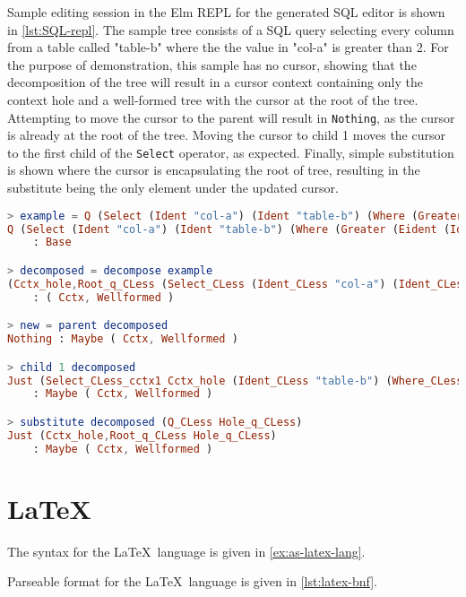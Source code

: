 Sample editing session in the Elm REPL for the generated SQL editor is
shown in \cref{lst:SQL-repl}. The sample tree consists of a SQL query
selecting every column from a table called "table-b" where the the value in
"col-a" is greater than 2. For the purpose of demonstration, this sample
has no cursor, showing that the decomposition of the tree will result in a
cursor context containing only the context hole and a well-formed tree
with the cursor at the root of the tree. Attempting to move the cursor to the
parent will result in \texttt{Nothing}, as the cursor is already at the root
of the tree. Moving the cursor to child 1 moves the cursor to the first child
of the \texttt{Select} operator, as expected. Finally, simple substitution
is shown where the cursor is encapsulating the root of tree, resulting
in the substitute being the only element under the updated cursor.

\begin{lstlisting}[style=inline, language=elm, caption={Elm REPL demonstration of the SQL editor}, label={lst:SQL-repl}]
> example = Q (Select (Ident "col-a") (Ident "table-b") (Where (Greater (Eident (Ident "col-a")) (Econst (Num 2)))))
Q (Select (Ident "col-a") (Ident "table-b") (Where (Greater (Eident (Ident "col-a")) (Econst (Num 2)))))
    : Base

> decomposed = decompose example
(Cctx_hole,Root_q_CLess (Select_CLess (Ident_CLess "col-a") (Ident_CLess "table-b") (Where_CLess (Greater_CLess (Eident_CLess (Ident_CLess "col-a")) (Econst_CLess (Num_CLess 2))))))
    : ( Cctx, Wellformed )

> new = parent decomposed
Nothing : Maybe ( Cctx, Wellformed )

> child 1 decomposed
Just (Select_CLess_cctx1 Cctx_hole (Ident_CLess "table-b") (Where_CLess (Greater_CLess (Eident_CLess (Ident_CLess "col-a")) (Econst_CLess (Num_CLess 2)))),Root_id_CLess (Ident_CLess "col-a"))
    : Maybe ( Cctx, Wellformed )

> substitute decomposed (Q_CLess Hole_q_CLess)
Just (Cctx_hole,Root_q_CLess Hole_q_CLess)
    : Maybe ( Cctx, Wellformed )
\end{lstlisting}

\section{\LaTeX}

The syntax for the \LaTeX \ language is given in \cref{ex:as-latex-lang}.

Parseable format for the \LaTeX \ language is given in \cref{lst:latex-bnf}.


